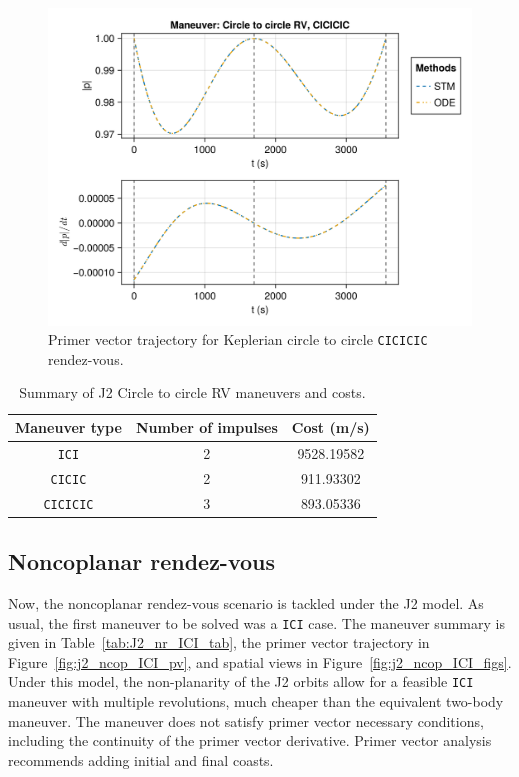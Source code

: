 \begin{figure}[htbp]
    \centering
    \includegraphics[width=\linewidth]{../results/j2/hohmann/CICICIC_primer_vector.png}
    \caption{Primer vector trajectory for Keplerian circle to circle \texttt{CICICIC} rendez-vous.}
    \label{fig:j2_c2c_CICICIC_pv}
\end{figure}

\begin{table}[htbp]
    \centering
    \begin{tabular}{ccc} \toprule
        Maneuver type & Number of impulses & Cost (m/s) \\ \midrule
        \texttt{ICI} & 2 & 9528.19582 \\
        \texttt{CICIC} & 2 & 911.93302 \\
        \texttt{CICICIC} & 3 & 893.05336 \\\bottomrule
    \end{tabular}
    \caption{Summary of J2 Circle to circle RV maneuvers and costs.}
    \label{tab:J2_ctcr_summary}
\end{table}

\subsection{Noncoplanar rendez-vous}

Now, the noncoplanar rendez-vous scenario is tackled under the J2 model. As usual, the first maneuver to be solved was a \texttt{ICI} case. The maneuver summary is given in Table~\ref{tab:J2_nr_ICI_tab}, the primer vector trajectory in Figure~\ref{fig:j2_ncop_ICI_pv}, and spatial views in Figure~\ref{fig:j2_ncop_ICI_figs}. Under this model, the non-planarity of the J2 orbits allow for a feasible \texttt{ICI} maneuver with multiple revolutions, much cheaper than the equivalent two-body maneuver. The maneuver does not satisfy primer vector necessary conditions, including the continuity of the primer vector derivative. Primer vector analysis recommends adding initial and final coasts.

